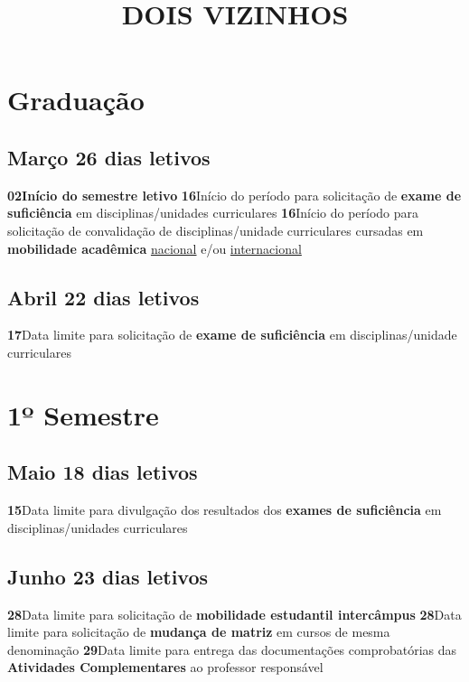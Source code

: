 \documentclass[thesis]{hmcposter}
\author{ }
\title{DOIS VIZINHOS}
\begin{document}
\begin{poster}
\normalsize\section{\color{hmcorange}Graduação}\subsection{Março \hfill 26 dias letivos}\textbf{02}\qquad \textbf{Início do semestre letivo} \newline \null\textbf{16}\qquad Início do período para solicitação de \textbf{exame de suficiência} em disciplinas/unidades curriculares \newline \null\textbf{16}\qquad Início do período para solicitação de convalidação de disciplinas/unidade curriculares cursadas em \textbf{mobilidade acadêmica} \underline{nacional} e/ou \underline{internacional} \newline \null\subsection{Abril \hfill 22 dias letivos}\textbf{17}\qquad Data limite para solicitação de \textbf{exame de suficiência} em disciplinas/unidade curriculares \newline \null\vfill\null
\columnbreak
\section{\hfill \color{hmcorange}1º Semestre}
\subsection{Maio \hfill 18 dias letivos}\textbf{15}\qquad Data limite para divulgação dos resultados dos \textbf{exames de suficiência} em disciplinas/unidades curriculares \newline \null\subsection{Junho \hfill 23 dias letivos}\textbf{28}\qquad Data limite para solicitação de \textbf{mobilidade estudantil intercâmpus} \newline \null\textbf{28}\qquad Data limite para solicitação de \textbf{mudança de matriz} em cursos de mesma denominação \newline \null\textbf{29}\qquad Data limite para entrega das documentações comprobatórias das \textbf{Atividades Complementares} ao professor responsável \newline \null\newpage

\end{poster}
\end{document}
